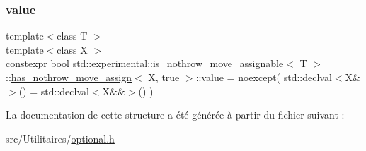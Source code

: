 \subsubsection{\texorpdfstring{value}{value}}
{\footnotesize\ttfamily template$<$class T $>$ \\
template$<$class X $>$ \\
constexpr bool \hyperlink{structstd_1_1experimental_1_1is__nothrow__move__assignable}{std\+::experimental\+::is\+\_\+nothrow\+\_\+move\+\_\+assignable}$<$ T $>$\+::\hyperlink{structstd_1_1experimental_1_1is__nothrow__move__assignable_1_1has__nothrow__move__assign}{has\+\_\+nothrow\+\_\+move\+\_\+assign}$<$ X, true $>$\+::value = noexcept( std\+::declval$<$X\&$>$() = std\+::declval$<$X\&\&$>$() )\hspace{0.3cm}{\ttfamily [static]}}



La documentation de cette structure a été générée à partir du fichier suivant \+:\begin{DoxyCompactItemize}
\item 
src/\+Utilitaires/\hyperlink{optional_8h}{optional.\+h}\end{DoxyCompactItemize}
